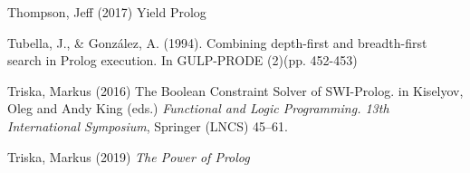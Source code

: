 \begin{thebibliography}{99}
 Thompson, Jeff (2017) Yield Prolog

 Tubella, J., \& González, A. (1994). Combining depth-first and breadth-first search in Prolog execution. In GULP-PRODE (2)(pp. 452-453)

Triska, Markus (2016) The {Boolean} Constraint Solver of SWI-Prolog. in Kiselyov, Oleg and Andy King (eds.) \textit{Functional and Logic Programming. 13th International Symposium}, Springer (LNCS) 45--61.  

\begin{comment}
This is a more proper representation of the preceding--although it doesn't list Springer as the publisher. Can we get LaTeX to handle it?
@inproceedings{Triska2016,
  author    = "Markus Triska",
  title     = "The {Boolean} Constraint Solver of {SWI-Prolog}:
               System Description",
  booktitle = "FLOPS: Functional and Logic Programming. 13th International Symposium",
  series    = "LNCS",
  volume    = 9613,
  year      = 2016,
  pages     = "45--61"
}
\end{comment}


Triska, Markus (2019) \textit{The Power of Prolog} 





\end{thebibliography}
